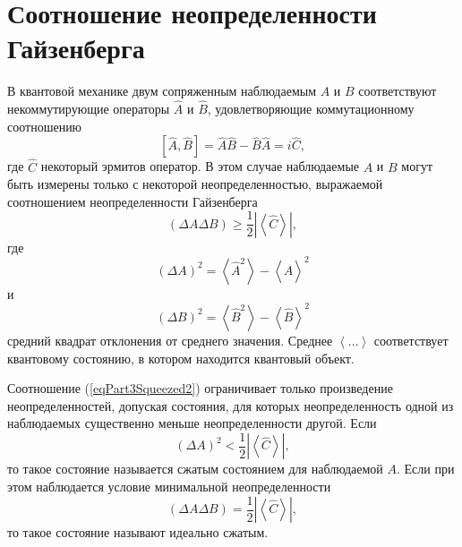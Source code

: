 \section{Соотношение неопределенности Гайзенберга}
В квантовой механике двум сопряженным наблюдаемым $A$ и $B$
соответствуют некоммутирующие операторы $\hat{A}$ и $\hat{B}$,
удовлетворяющие коммутационному соотношению
\begin{equation}
\left[
\hat{A}, \hat{B}
\right] = 
\hat{A}\hat{B} - \hat{B}\hat{A} = i \hat{C},
\nonumber
\end{equation}
где $\hat{C}$ некоторый эрмитов оператор. В этом случае наблюдаемые
$A$ и $B$ могут быть измерены только с некоторой неопределенностью,
выражаемой соотношением неопределенности Гайзенберга
\begin{equation}
\left(
\Delta A \Delta B
\right) \ge \frac{1}{2} \left|\left<\hat{C}\right>\right|,
\label{eqPart3Squeezed2}
\end{equation}
где
\[
\left(\Delta A\right)^2 = \left<\hat{A}^2\right> - \left<\hat{A}\right>^2
\]
и
\[
\left(\Delta B\right)^2 = \left<\hat{B}^2\right> - \left<\hat{B}\right>^2
\]
средний квадрат отклонения от среднего значения. 
Среднее $\left<\dots\right>$ соответствует квантовому состоянию, в
котором находится квантовый объект.

Соотношение (\ref{eqPart3Squeezed2}) ограничивает только произведение
неопределенностей, допуская состояния, для которых неопределенность
одной из наблюдаемых существенно меньше неопределенности другой.
Если 
\begin{equation}
\left(\Delta A\right)^2 < \frac{1}{2} \left|\left<\hat{C}\right>\right|,
\nonumber
\end{equation}
то такое состояние называется сжатым состоянием для наблюдаемой
$A$. Если при этом наблюдается условие минимальной неопределенности
\begin{equation}
\left(
\Delta A \Delta B
\right) = \frac{1}{2} \left|\left<\hat{C}\right>\right|,
\nonumber
\end{equation}
то такое состояние называют идеально сжатым.
